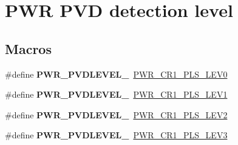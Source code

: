 \hypertarget{group___p_w_r___p_v_d__detection__level}{}\section{P\+WR P\+VD detection level}
\label{group___p_w_r___p_v_d__detection__level}
\subsection*{Macros}
\begin{DoxyCompactItemize}
\item 
\mbox{\label{group___p_w_r___p_v_d__detection__level_gaddf4616a143ac3481f3043f2a4c21c18}} 
\#define {\bfseries P\+W\+R\+\_\+\+P\+V\+D\+L\+E\+V\+E\+L\+\_}~\mbox{\hyperlink{group___peripheral___registers___bits___definition_ga9f90ed5fb8f7820030d4af6dd328e878}{P\+W\+R\+\_\+\+C\+R1\+\_\+\+P\+L\+S\+\_\+\+L\+E\+V0}}
\item 
\mbox{\label{group___p_w_r___p_v_d__detection__level_ga06e55b20a8777594f1a91ee71fac1f79}} 
\#define {\bfseries P\+W\+R\+\_\+\+P\+V\+D\+L\+E\+V\+E\+L\+\_}~\mbox{\hyperlink{group___peripheral___registers___bits___definition_ga7c408bce8836b7af46141cddcd6f20ac}{P\+W\+R\+\_\+\+C\+R1\+\_\+\+P\+L\+S\+\_\+\+L\+E\+V1}}
\item 
\mbox{\label{group___p_w_r___p_v_d__detection__level_gab26bb78650bbaef26ac9f9123c791cc7}} 
\#define {\bfseries P\+W\+R\+\_\+\+P\+V\+D\+L\+E\+V\+E\+L\+\_}~\mbox{\hyperlink{group___peripheral___registers___bits___definition_gae3ecef9c0e7ba8ce56e16245bc71e08f}{P\+W\+R\+\_\+\+C\+R1\+\_\+\+P\+L\+S\+\_\+\+L\+E\+V2}}
\item 
\mbox{\label{group___p_w_r___p_v_d__detection__level_ga7b751743b3e29c237e6a0e1d7bdd0503}} 
\#define {\bfseries P\+W\+R\+\_\+\+P\+V\+D\+L\+E\+V\+E\+L\+\_}~\mbox{\hyperlink{group___peripheral___registers___bits___definition_ga582890057e060cbf8a55109adf7e0de1}{P\+W\+R\+\_\+\+C\+R1\+\_\+\+P\+L\+S\+\_\+\+L\+E\+V3}}
\item 
\mbox{\label{group___p_w_r___p_v_d__detection__level_ga03c0d3ae547deb1a51b8acafac101698}} 

\end{DoxyCompactItemize}
